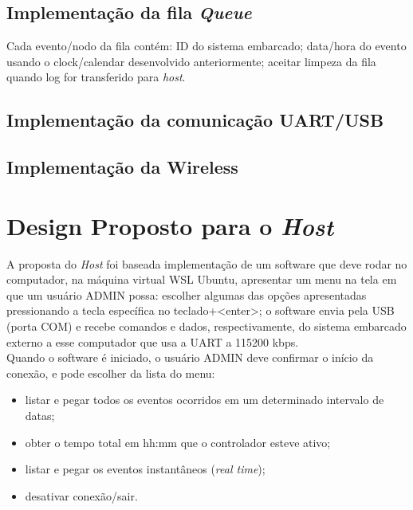 \documentclass[10pt,twocolumn,letterpaper]{article}
\begin{document}
\subsection[short]{Implementação da fila \emph{Queue}}
Cada evento/nodo da fila contém: ID do sistema embarcado; data/hora do evento usando o 
clock/calendar desenvolvido anteriormente; aceitar limpeza da fila quando log for transferido
para \emph{host}.
\subsection[short]{Implementação da comunicação UART/USB}

\subsection[short]{Implementação da Wireless}


\section{Design Proposto para o \emph{Host}}
A proposta do \emph{Host} foi baseada implementação de um software que deve rodar no computador, na máquina 
virtual WSL Ubuntu, apresentar um menu na tela em que um usuário ADMIN possa: escolher algumas das opções 
apresentadas pressionando a tecla específica no teclado+<enter>; o software envia pela USB (porta COM) e recebe
comandos e dados, respectivamente, do sistema embarcado externo a esse computador que usa a UART a 115200 kbps.\\
Quando o software é iniciado, o usuário ADMIN deve confirmar o início da conexão, e pode escolher da lista do menu: 
\begin{itemize}
  \item listar e pegar todos os eventos ocorridos em um determinado intervalo de datas; 
  \item obter o tempo total em hh:mm que o controlador esteve ativo;
  \item listar e pegar os eventos instantâneos (\emph{real time});
  \item desativar conexão/sair.
\end{itemize}



\end{document}
